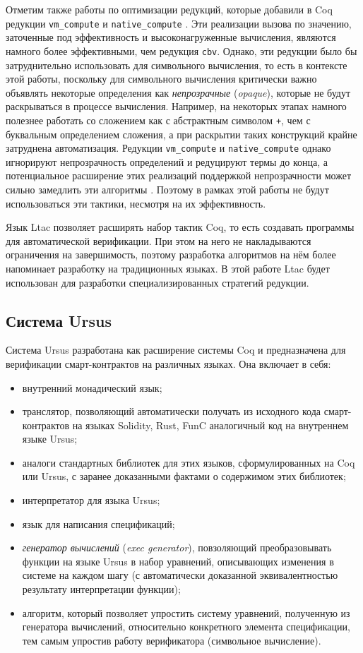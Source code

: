 \documentclass[../diploma.tex]{subfiles}
\begin{document}
Отметим также работы по оптимизации редукций, которые добавили в Coq редукции \texttt{vm\_compute} \cite{vm} и \texttt{native\_compute} \cite{native}. Эти реализации вызова по значению, заточенные под эффективность и высоконагруженные вычисления, являются намного более эффективными, чем редукция \texttt{cbv}. Однако, эти редукции было бы затруднительно использовать для символьного вычисления, то есть в контексте этой работы, поскольку для символьного вычисления критически важно объявлять некоторые определения как \textit{непрозрачные} (\textit{opaque}), которые не будут раскрываться в процессе вычисления. Например, на некоторых этапах намного полезнее работать со сложением как с абстрактным символом \texttt{+}, чем с буквальным определением сложения, а при раскрытии таких конструкций крайне затруднена автоматизация. Редукции \texttt{vm\_compute} и \texttt{native\_compute} однако игнорируют непрозрачность определений и редуцируют термы до конца, а потенциальное расширение этих реализаций поддержкой непрозрачности может сильно замедлить эти алгоритмы \cite{opaque}. Поэтому в рамках этой работы не будут использоваться эти тактики, несмотря на их эффективность.

Язык Ltac позволяет расширять набор тактик Coq, то есть создавать программы для автоматической верификации. При этом на него не накладываются ограничения на завершимость, поэтому разработка алгоритмов на нём более напоминает разработку на традиционных языках. В этой работе Ltac будет использован для разработки специализированных стратегий редукции.

\subsection{Система Ursus} \label{ursus}

Система Ursus разработана как расширение системы Coq и предназначена для верификации смарт-контрактов на различных языках. Она включает в себя:
\begin{itemize}
    \item внутренний монадический язык;
    \item транслятор, позволяющий автоматически получать из исходного кода смарт-контрактов на языках Solidity, Rust, FunC аналогичный код на внутреннем языке Ursus;
    \item аналоги стандартных библиотек для этих языков, сформулированных на Coq или Ursus, с заранее доказанными фактами о содержимом этих библиотек;
    \item интерпретатор для языка Ursus;
    \item язык для написания спецификаций;
    \item \textit{генератор вычислений} (\textit{exec generator}), повзоляющий преобразовывать функции на языке Ursus в набор уравнений, описывающих изменения в системе на каждом шагу (с автоматически доказанной эквивалентностью результату интерпретации функции);
    \item алгоритм, который позволяет упростить систему уравнений, полученную из генератора вычислений, относительно конкретного элемента спецификации, тем самым упростив работу верификатора (символьное вычисление).
\end{itemize}
\end{document}

